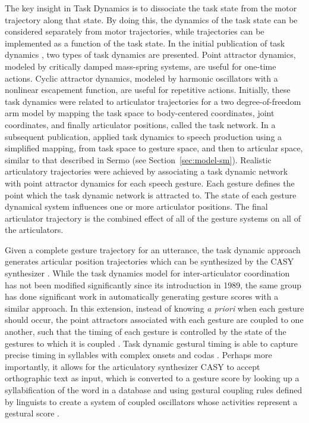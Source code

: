 The key insight in Task Dynamics
is to dissociate the task state
from the motor trajectory
along that state.
By doing this, the dynamics of the task state
can be considered separately from motor trajectories,
while trajectories can be implemented
as a function of the task state.
In the initial publication of task dynamics
\citep{saltzman1987},
two types of task dynamics are presented.
Point attractor dynamics,
modeled by critically damped mass-spring systems,
are useful for one-time actions.
Cyclic attractor dynamics,
modeled by harmonic oscillators
with a nonlinear escapement function,
are useful for repetitive actions.
Initially, these task dynamics were
related to articulator trajectories
for a two degree-of-freedom arm model
by mapping the task space
to body-centered coordinates,
joint coordinates,
and finally articulator positions,
called the task network.
In a subsequent publication,
\citet{saltzman1989}
applied task dynamics to speech production
using a simplified mapping,
from task space
to gesture space,
and then to articular space,
similar to that described in Sermo
(see Section~\ref{sec:model-sm}).
Realistic articulatory trajectories
were achieved
by associating a task dynamic network
with point attractor dynamics
for each speech gesture.
Each gesture defines
the point which the task dynamic network
is attracted to.
The state of each gesture dynamical system
influences one or more articulator positions.
The final articulator trajectory
is the combined effect
of all of the gesture systems
on all of the articulators.

Given a complete gesture trajectory
for an utterance,
the task dynamic approach
generates articular position trajectories
which can be synthesized
by the CASY synthesizer \citep{iskarous2003}.
While the task dynamics model
for inter-articulator coordination has not been
modified significantly since its introduction in 1989,
the same group has done significant work
in automatically generating gesture scores
with a similar approach.
In this extension,
instead of knowing \textit{a priori}
when each gesture should occur,
the point attractors associated
with each gesture are coupled
to one another,
such that the timing of each gesture
is controlled by the state
of the gestures to which it is coupled
\citep{saltzman2000}.
Task dynamic gestural timing
is able to capture precise timing
in syllables with complex onsets
and codas \citep{nam2003,goldstein2006}.
Perhaps more importantly,
it allows for the articulatory synthesizer
CASY to accept orthographic text as input,
which is converted to a gesture score
by looking up a syllabification
of the word in a database
and using gestural coupling rules
defined by linguists
to create a system of coupled oscillators
whose activities represent a gestural score
\citep{nam2004,goldstein2009}.

